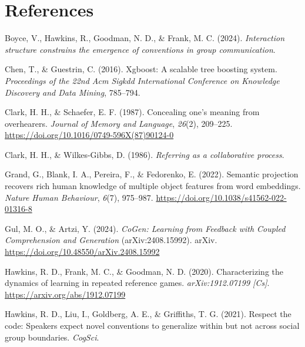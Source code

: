 \documentclass[10pt, letterpaper]{article}
\begin{document}
\section{References}\label{references}

\setlength{\parindent}{-0.1in} 
\setlength{\leftskip}{0.125in}

\noindent

\label{refs}
\begin{CSLReferences}{1}{0}
Boyce, V., Hawkins, R., Goodman, N. D., \& Frank, M. C. (2024).
\emph{Interaction structure constrains the emergence of conventions in
group communication}.

Chen, T., \& Guestrin, C. (2016). Xgboost: {A} scalable tree boosting
system. \emph{Proceedings of the 22nd Acm Sigkdd International
Conference on Knowledge Discovery and Data Mining}, 785--794.

Clark, H. H., \& Schaefer, E. F. (1987). Concealing one's meaning from
overhearers. \emph{Journal of Memory and Language}, \emph{26}(2),
209--225. \url{https://doi.org/10.1016/0749-596X(87)90124-0}

Clark, H. H., \& Wilkes-Gibbs, D. (1986). \emph{Referring as a
collaborative process}.

Grand, G., Blank, I. A., Pereira, F., \& Fedorenko, E. (2022). Semantic
projection recovers rich human knowledge of multiple object features
from word embeddings. \emph{Nature Human Behaviour}, \emph{6}(7),
975--987. \url{https://doi.org/10.1038/s41562-022-01316-8}

Gul, M. O., \& Artzi, Y. (2024). \emph{{CoGen}: {Learning} from
{Feedback} with {Coupled Comprehension} and {Generation}}
(arXiv:2408.15992). arXiv.
\url{https://doi.org/10.48550/arXiv.2408.15992}

Hawkins, R. D., Frank, M. C., \& Goodman, N. D. (2020). Characterizing
the dynamics of learning in repeated reference games.
\emph{arXiv:1912.07199 {[}Cs{]}}. \url{https://arxiv.org/abs/1912.07199}

Hawkins, R. D., Liu, I., Goldberg, A. E., \& Griffiths, T. G. (2021).
Respect the code: {Speakers} expect novel conventions to generalize
within but not across social group boundaries. \emph{CogSci}.


\end{CSLReferences}
\end{document}
